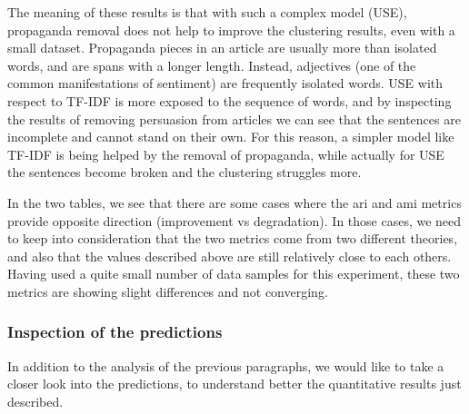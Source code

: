 The meaning of these results
is that with such a complex model (USE),
propaganda removal does not help to improve the clustering results, even with a small dataset.
Propaganda pieces in an article are usually more than isolated words, and are spans with a longer length. Instead, adjectives (one of the common manifestations of sentiment) are frequently isolated words. USE with respect to TF-IDF is more exposed to the sequence of words, and by inspecting the results of removing persuasion from articles we can see that the sentences are incomplete and cannot stand on their own. For this reason, a simpler model like TF-IDF is being helped by the removal of propaganda, while actually for USE the sentences become broken and the clustering struggles more.

In the two tables, we see that there are some cases where the \acrshort{ari} and \acrshort{ami} metrics provide opposite direction (improvement vs degradation). In those cases, we need to keep into consideration that the two metrics come from two different theories, and also that the values described above are still relatively close to each others.
Having used a quite small number of data samples for this experiment, these two metrics are showing slight differences and not converging.

\subsubsection{Inspection of the predictions}

In addition to the analysis of the previous paragraphs, we would like to take a closer look into the predictions, to understand better the quantitative results just described.

